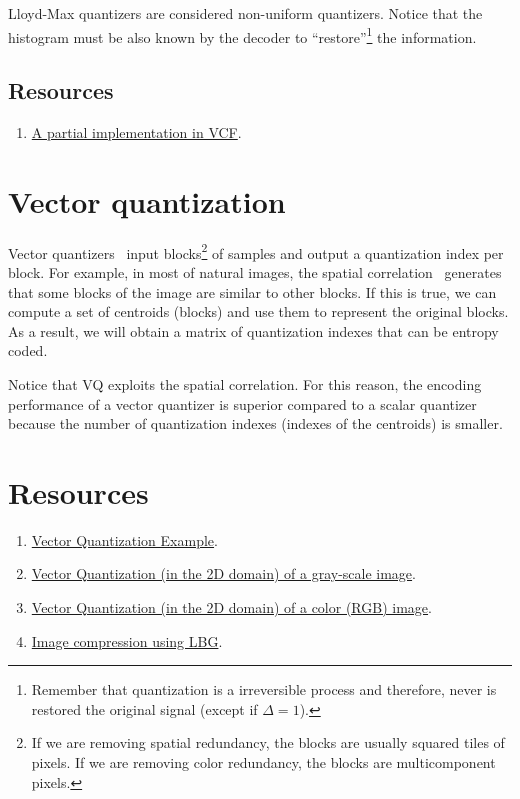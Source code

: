 Lloyd-Max quantizers are considered non-uniform quantizers. Notice
that the histogram must be also known by the decoder to
``restore''\footnote{Remember that quantization is a irreversible
process and therefore, never is restored the original signal (except
if $\Delta=1$).} the information.

\subsection*{Resources}

\begin{enumerate}
\item
  \href{https://github.com/Sistemas-Multimedia/VCF/blob/main/src/LloydMax.py}{A
    partial implementation in VCF}.
\end{enumerate}

\section{Vector quantization}

Vector quantizers~\cite{vruiz__vector_quantization} input
blocks\footnote{If we are removing spatial redundancy, the blocks are
usually squared tiles of pixels. If we are removing color redundancy,
the blocks are multicomponent pixels.} of samples and output a
quantization index per block. For example, in most of natural images,
the spatial correlation~\cite{vruiz__visual_redundancy} generates that
some blocks of the image are similar to other blocks. If this is true,
we can compute a set of centroids (blocks) and use them to represent
the original blocks. As a result, we will obtain a matrix of
quantization indexes that can be entropy coded.

Notice that VQ exploits the spatial correlation. For this reason, the
encoding performance of a vector quantizer is superior compared to a
scalar quantizer because the number of quantization indexes (indexes
of the centroids) is smaller.

\section*{Resources}

\begin{enumerate}
\item
  \href{https://scikit-learn.org/stable/auto_examples/cluster/plot_face_compress.html#sphx-glr-auto-examples-cluster-plot-face-compress-py}{Vector
    Quantization Example}.
\item
  \href{https://github.com/vicente-gonzalez-ruiz/vector_quantization/blob/main/docs/gray_VQ.ipynb}{Vector
    Quantization (in the 2D domain) of a gray-scale image}.
\item
  \href{https://github.com/vicente-gonzalez-ruiz/vector_quantization/blob/main/docs/spatial_color_VQ.ipynb}{Vector
    Quantization (in the 2D domain) of a color (RGB) image}.
  
\item \href{https://github.com/droidadroit/LBG}{Image compression using LBG}.
\end{enumerate}

